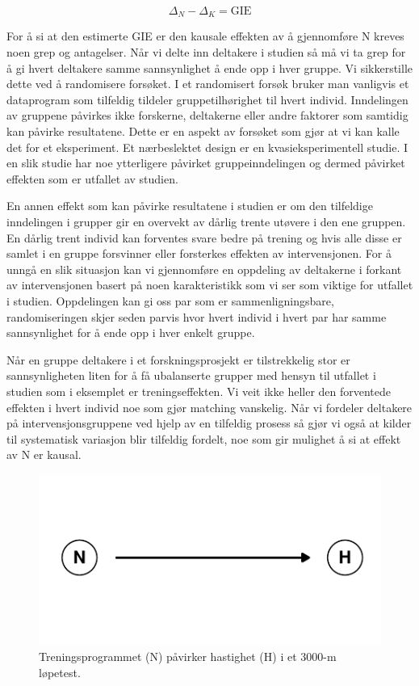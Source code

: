 \documentclass[
  letterpaper,
  DIV=11,
  numbers=noendperiod,
  oneside]{scrreprt}
\begin{document}
\[ \Delta_N - \Delta_K = \text{GIE}\]

For å si at den estimerte GIE er den kausale effekten av å gjennomføre N
kreves noen grep og antagelser. Når vi delte inn deltakere i studien så
må vi ta grep for å gi hvert deltakere samme sannsynlighet å ende opp i
hver gruppe. Vi sikkerstille dette ved å randomisere forsøket. I et
randomisert forsøk bruker man vanligvis et dataprogram som tilfeldig
tildeler gruppetilhørighet til hvert individ. Inndelingen av gruppene
påvirkes ikke forskerne, deltakerne eller andre faktorer som samtidig
kan påvirke resultatene. Dette er en aspekt av forsøket som gjør at vi
kan kalle det for et eksperiment. Et nærbeslektet design er en
kvasieksperimentell studie. I en slik studie har noe ytterligere
påvirket gruppeinndelingen og dermed påvirket effekten som er utfallet
av studien.

En annen effekt som kan påvirke resultatene i studien er om den
tilfeldige inndelingen i grupper gir en overvekt av dårlig trente
utøvere i den ene gruppen. En dårlig trent individ kan forventes svare
bedre på trening og hvis alle disse er samlet i en gruppe forsvinner
eller forsterkes effekten av intervensjonen. For å unngå en slik
situasjon kan vi gjennomføre en oppdeling av deltakerne i forkant av
intervensjonen basert på noen karakteristikk som vi ser som viktige for
utfallet i studien. Oppdelingen kan gi oss par som er
sammenligningsbare, randomiseringen skjer seden parvis hvor hvert
individ i hvert par har samme sannsynlighet for å ende opp i hver enkelt
gruppe.

Når en gruppe deltakere i et forskningsprosjekt er tilstrekkelig stor er
sannsynligheten liten for å få ubalanserte grupper med hensyn til
utfallet i studien som i eksemplet er treningseffekten. Vi veit ikke
heller den forventede effekten i hvert individ noe som gjør matching
vanskelig. Når vi fordeler deltakere på intervensjonsgruppene ved hjelp
av en tilfeldig prosess så gjør vi også at kilder til systematisk
variasjon blir tilfeldig fordelt, noe som gir mulighet å si at effekt av
N er kausal.

\begin{figure}

{\centering \includegraphics{03-kausalsammenheng_files/figure-pdf/fig-dag-eksperiment-1.pdf}

}

\caption{\label{fig-dag-eksperiment}Treningsprogrammet (N) påvirker
hastighet (H) i et 3000-m løpetest.}

\end{figure}
\end{document}
